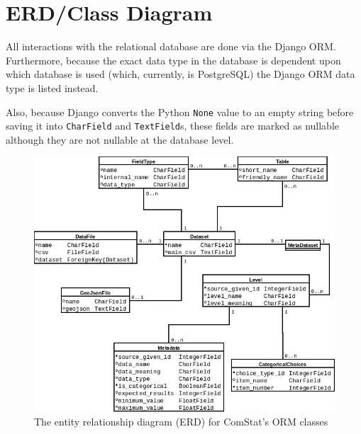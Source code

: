 
\section{ERD/Class Diagram}

All interactions with the relational database are done via the Django ORM. Furthermore, because the exact data type in the database is dependent upon which database is used (which, currently, is PostgreSQL) the Django ORM data type is listed instead.

Also, because Django converts the Python \texttt{None} value to an empty string before saving it into \texttt{CharField} and \texttt{TextField}s, these fields are marked as nullable although they are not nullable at the database level.

\begin{figure}[h!]
    \centering
    \includegraphics[width=120mm]{images/erd.jpg}
    \caption{The entity relationship diagram (ERD) for ComStat's ORM classes}
    \label{fig:img-comstat-erd}
\end{figure}
